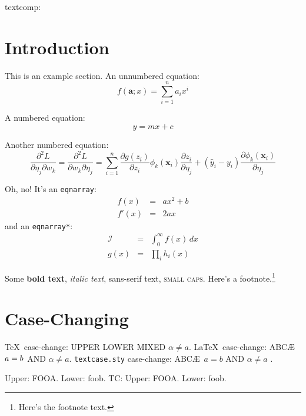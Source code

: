 \documentclass{article}
\newcommand*{\pfrac}[2]{\frac{\partial#1}{\partial#2}}
\newcommand*{\dpfrac}[3]{\frac{\partial^2#1}{\partial#2\partial#3}}
\renewcommand*{\vec}[1]{\boldsymbol{#1}}
\begin{document}


textcomp: \texttwosuperior\ \texteuro

\section{Introduction}
\label{sec:intro}

This is an example section. An unnumbered equation:
\[
  f(\vec{a}; x) = \sum_{i=1}^n a_i x^i
\]

A numbered equation:
\begin{equation}
y = m x + c
\label{eq:mx+c}
\end{equation}

Another numbered equation:
\begin{equation}\label{eq:dp}
 \dpfrac{L}{\eta_j}{w_k}
 = \dpfrac{L}{w_k}{\eta_j}
 = \sum_{i=1}^n \pfrac{g(z_i)}{z_i}
   \phi_k(\vec{x}_i)\pfrac{z_i}{\eta_j}
 + (\hat{y}_i - y_i)\pfrac{\phi_k(\vec{x}_i)}{\eta_j}
\end{equation}

Oh, no! It's an \texttt{eqnarray}:
\begin{eqnarray}
f(x) &=& ax^2 +b\label{eq:f}\\
f'(x) &=& 2ax\label{eq:df}
\end{eqnarray}
and an \texttt{eqnarray*}:
\begin{eqnarray*}
\mathcal{I} & = & \int_0^\infty f(x)\,dx\\
g(x) & = & \prod_i h_i(x)
\end{eqnarray*}

Some \textbf{bold text}, \textit{italic text}, 
\textsf{sans-serif text}, \textsc{small caps}.
Here's a footnote.\footnote{Here's the footnote text.}

\section{Case-Changing}
\label{sec:casechange}

\TeX\ case-change: \uppercase{upper \lowercase{LOWER} MiXeD $\alpha \neq a$.}
\LaTeX\ case-change: \MakeUppercase{abc\ae\ \protect\( a = b
\protect\) and $\alpha \neq a$}.
\texttt{textcase.sty} case-change: \MakeTextUppercase{abc\ae\ \( a = b \) and 
$\alpha \neq a$ }.

\newcommand{\foo}{fooa}
\newcommand{\FOO}{foob}
Upper: \uppercase{\foo}. Lower: \lowercase{\FOO}.
TC: Upper: \MakeTextUppercase{\foo}. Lower:
\MakeTextLowercase{\FOO}.
\end{document}
